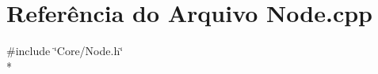 \section{Referência do Arquivo Node.\+cpp}
\label{_node_8cpp}
{\ttfamily \#include \char`\"{}Core/\+Node.\+h\char`\"{}}\\*
